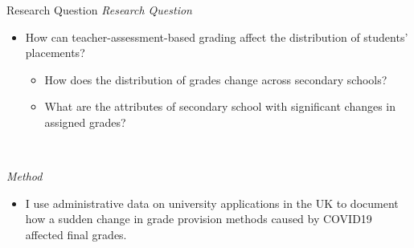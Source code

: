 \begin{frame}{Research Question}
    \emph{Research Question}
    \begin{itemize}
        \item How can teacher-assessment-based grading affect the distribution of students' placements?

        \begin{itemize}
            \item How does the distribution of grades change across secondary schools?
    
            \item What are the attributes of secondary school with significant changes in assigned grades?

        \end{itemize}
    \end{itemize}

    \

    \emph{Method}
    \begin{itemize}
        \item I use administrative data on university applications in the UK to document how a sudden change in grade provision methods caused by COVID19 affected final grades.
        
    \end{itemize}
\end{frame}